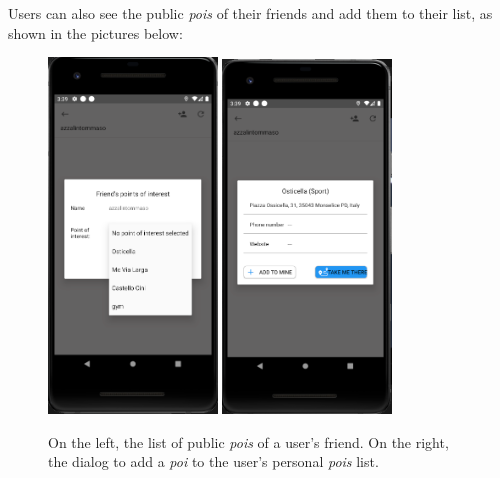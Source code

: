 \documentclass[../../main]{subfiles}
\begin{document}
\noindent
Users can also see the public \textit{pois} of their friends and add them to their list, as shown in the pictures below:
\begin{figure}[H]
    \centering
    \includegraphics[width=0.4\textwidth]{images/app/friend/friend_poi}
    \includegraphics[width=0.4\textwidth]{images/app/friend/add_friend_poi}
    \caption{On the left, the list of public \textit{pois} of a user's friend. On the right, the dialog to add a \textit{poi} to the user's personal \textit{pois} list.}
\end{figure}
\end{document}

